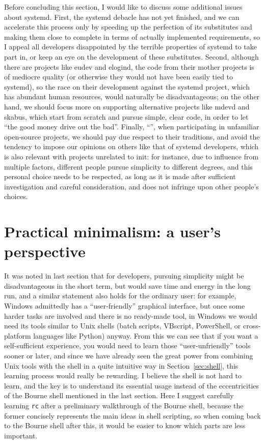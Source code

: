 Before concluding this section, I would like to discuss some additional issues
about systemd.  First, the systemd debacle has not yet finished, and we can
accelerate this process only by speeding up the perfection of its substitutes
and making them close to complete in terms of actually implemented requirements,
so I appeal all developers disappointed by the terrible properties of systemd
to take part in, or keep an eye on the development of these substitutes.
Second, although there are projects like eudev and elogind, the code from their
mother projects is of mediocre quality (or otherwise they would not have been
easily tied to systemd), so the race on their development against the systemd
project, which has abundant human resources, would naturally be disadvantageous;
on the other hand, we should focus more on supporting alternative projects
like mdevd and skabus, which start from scratch and pursue simple, clear code,
in order to let ``the good money drive out the bad''.  Finally, ``'', when participating in unfamiliar
open-source projects, we should pay due respect to their traditions, and avoid
the tendency to impose our opinions on others like that of systemd developers,
which is also relevant with projects unrelated to init: for instance, due
to influence from multiple factors, different people pursue simplicity
to different degrees, and this personal choice needs to be respected,
as long as it is made after sufficient investigation and careful
consideration, and does not infringe upon other people's choices.

\section{Practical minimalism: a user's perspective}\label{sec:user}

It was noted in last section that for developers, pursuing simplicity might be
disadvantageous in the short term, but would save time and energy in the long
run, and a similar statement also holds for the ordinary user: for example,
Windows admittedly has a ``user-friendly'' graphical interface, but once some
harder tasks are involved and there is no ready-made tool, in Windows we would
need its tools similar to Unix shells (batch scripts, VBscript, PowerShell,
or cross-platform languages like Python) anyway.  From this we can see that
if you want a self-sufficient experience, you would need to learn those
``user-unfriendly'' tools sooner or later, and since we have already seen the
great power from combining Unix tools with the shell in a quite intuitive way
in Section~\ref{sec:shell}, this learning process would really be rewarding.
I believe the shell is not hard to learn, and the key is to understand
its essential usage instead of the eccentricities of the Bourne shell
mentioned in the last section.  Here I suggest carefully learning \verb|rc|%
 after a preliminary walkthrough of the Bourne shell,
because the former concisely represents the main ideas in shell scripting,
so when coming back to the Bourne shell after this, it would
be easier to know which parts are less important.

